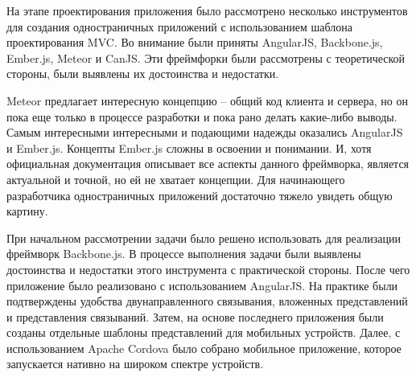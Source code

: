 На этапе проектирования приложения было рассмотрено несколько инструментов для создания одностраничных приложений с использованием шаблона проектирования MVC. Во внимание были приняты AngularJS, Backbone.js, Ember.js, Meteor и CanJS. Эти фреймфорки были рассмотрены с теоретической стороны, были выявлены их достоинства и недостатки.

Meteor предлагает интересную концепцию -- общий код клиента и сервера, но он пока еще только в процессе разработки и пока рано делать какие-либо выводы. Самым интересными интересными и подающими надежды оказались AngularJS и Ember.js. Концепты Ember.js сложны в освоении и понимании. И, хотя официальная документация описывает все аспекты данного фреймворка, является актуальной и точной, но ей не хватает концепции. Для начинающего разработчика одностраничных приложений достаточно тяжело увидеть общую картину.

При начальном рассмотрении задачи было решено использовать для реализации фреймворк Backbone.js. В процессе выполнения задачи были выявлены достоинства и недостатки этого инструмента с практической стороны. После чего приложение было реализовано с использованием AngularJS. На практике были подтверждены удобства двунаправленного связывания, вложенных представлений и представления связываний. Затем, на основе последнего приложения были созданы отдельные шаблоны представлений для мобильных устройств. Далее, с использованием Apache Cordova было собрано мобильное приложение, которое запускается нативно на широком спектре устройств.